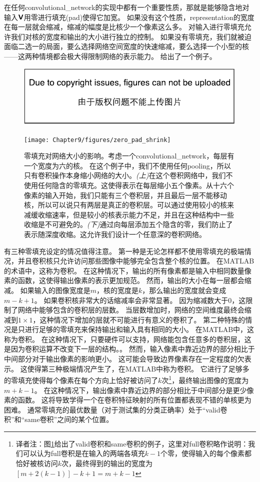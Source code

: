 在任何\gls{convolutional_network}的实现中都有一个重要性质，那就是能够隐含地对输入$\textsf{\textbf{V}}$用零进行填充(pad)使得它加宽。
如果没有这个性质，\gls{representation}的宽度在每一层就会缩减，缩减的幅度是比核少一个像素这么多。
对输入进行零填充允许我们对核的宽度和输出的大小进行独立的控制。
如果没有零填充，我们就被迫面临二选一的局面，要么选择网络空间宽度的快速缩减，要么选择一个小型的核——这两种情境都会极大得限制网络的表示能力。
给出了一个例子。
\begin{figure}[!htb]
\ifOpenSource
\centerline{\includegraphics{figure.pdf}}
\else
\centerline{\texttt{[image: Chapter9/figures/zero\_pad\_shrink]}}
\fi
\caption{零填充对网络大小的影响。考虑一个\gls{convolutional_network}，每层有一个宽度为六的核。 在这个例子中，我们不使用任何\gls{pooling}，所以只有卷积操作本身缩小网络的大小。\emph{(上)}在这个卷积网络中，我们不使用任何隐含的零填充。这使得表示在每层缩小五个像素。从十六个像素的输入开始，我们只能有三个卷积层，并且最后一层不能移动核，所以可以说只有两层是真正的卷积层。可以通过使用较小的核来减缓收缩速率，但是较小的核表示能力不足，并且在这种结构中一些收缩是不可避免的。\emph{(下)}通过向每层添加五个隐含的零，我们防止了表示随深度收缩。这允许我们设计一个任意深的卷积网络。}
\label{fig:chap9_zero_pad_shrink}
\end{figure}

有三种零填充设定的情况值得注意。
第一种是无论怎样都不使用零填充的极端情况，并且卷积核只允许访问那些图像中能够完全包含整个核的位置。
在MATLAB的术语中，这称为卷积。
在这种情况下，输出的所有像素都是输入中相同数量像素的函数，这使得输出像素的表示更加规范。
然而，输出的大小在每一层都会缩减。
如果输入的图像宽度是$m$，核的宽度是$k$，那么输出的宽度就会变成$m-k+1$。
如果卷积核非常大的话缩减率会非常显著。
因为缩减数大于0，这限制了网络中能够包含的卷积层的层数。
当层数增加时，网络的空间维度最终会缩减到$1\times 1$，这种情况下增加的层就不可能进行有意义的卷积了。
第二种特殊的情况是只进行足够的零填充来保持输出和输入具有相同的大小。
在MATLAB中，这称为卷积。
在这种情况下，只要硬件可以支持，网络能包含任意多的卷积层，这是因为卷积运算不改变下一层的结构。。
然而，输入像素中靠近边界的部分相比于中间部分对于输出像素的影响更小。
这可能会导致边界像素存在一定程度的欠表示。
这使得第三种极端情况产生了，在MATLAB中称为卷积。
它进行了足够多的零填充使得每个像素在每个方向上恰好被访问了$k$次\footnote{译者注：图\ref{fig:chap9_zero_pad_shrink}给出了\gls{valid}卷积和\gls{same}卷积的例子，这里对\gls{full}卷积略作说明：我们可以认为\gls{full}卷积是在输入的两端各填充$k-1$个零，使得输入的每个像素都恰好被核访问$k$次，最终得到的输出的宽度为$[m+2(k-1)]-k+1=m+k-1$}，最终输出图像的宽度为$m+k-1$。%
在这种情况下，输出像素中靠近边界的部分相比于中间部分是更少像素的函数。
这将导致学得一个在卷积特征映射的所有位置都表现不错的单核更为困难。
通常零填充的最优数量（对于测试集的分类正确率）处于``\gls{valid}卷积''和``\gls{same}卷积''之间的某个位置。

